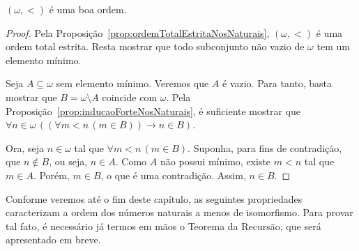 \begin{corollary}[$Z^--P$]\label{cor:boaOrdemDosNaturais}
    $(\omega, <)$ é uma boa ordem.
\end{corollary}
\begin{proof}
    Pela Proposição~\ref{prop:ordemTotalEstritaNosNaturais}, $(\omega, <)$ é uma ordem total estrita.
    Resta mostrar que todo subconjunto não vazio de $\omega$ tem um elemento mínimo.

    Seja $A\subseteq \omega$ sem elemento mínimo.
    Veremos que $A$ é vazio.
    Para tanto, basta mostrar que $B=\omega\setminus A$ coincide com $\omega$.
    Pela Proposição~\ref{prop:inducaoForteNosNaturais}, é suficiente mostrar que $\forall n \in \omega\, ((\forall m < n\, (m \in B)) \rightarrow n \in B)$.

    Ora, seja $n \in \omega$ tal que $\forall m < n\, (m \in B)$.
    Suponha, para fins de contradição, que $n \notin B$, ou seja, $n \in A$.
    Como $A$ não possui mínimo, existe $m < n$ tal que $m \in A$.
    Porém, $m \in B$, o que é uma contradição.
    Assim, $n \in B$.
\end{proof}

Conforme veremos até o fim deste capítulo, as seguintes propriedades caracterizam a ordem dos números naturais a menos de isomorfismo.
Para provar tal fato, é necessário já termos em mãos o Teorema da Recursão, que será apresentado em breve.

